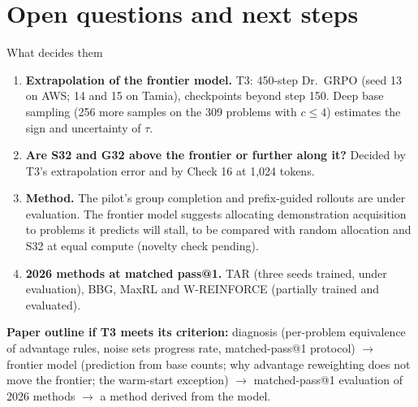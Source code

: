 \documentclass[10pt]{article}
\begin{document}
\section{Open questions and next steps}
\begin{open}{What decides them}
\begin{enumerate}
\item \textbf{Extrapolation of the frontier model.} T3: 450-step Dr.\ GRPO (seed 13 on AWS; 14 and 15 on Tamia), checkpoints beyond step 150. Deep base sampling (256 more samples on the 309 problems with $c\le4$) estimates the sign and uncertainty of $\tau$.
\item \textbf{Are S32 and G32 above the frontier or further along it?} Decided by T3's extrapolation error and by Check 16 at 1,024 tokens.
\item \textbf{Method.} The pilot's group completion and prefix-guided rollouts are under evaluation. The frontier model suggests allocating demonstration acquisition to problems it predicts will stall, to be compared with random allocation and S32 at equal compute (novelty check pending).
\item \textbf{2026 methods at matched pass@1.} TAR (three seeds trained, under evaluation), BBG, MaxRL and W-REINFORCE (partially trained and evaluated).
\end{enumerate}
\end{open}
\textbf{Paper outline if T3 meets its criterion:} diagnosis (per-problem equivalence of advantage rules, noise sets progress rate, matched-pass@1 protocol) $\to$ frontier model (prediction from base counts; why advantage reweighting does not move the frontier; the warm-start exception) $\to$ matched-pass@1 evaluation of 2026 methods $\to$ a method derived from the model.

\appendix
\end{document}
